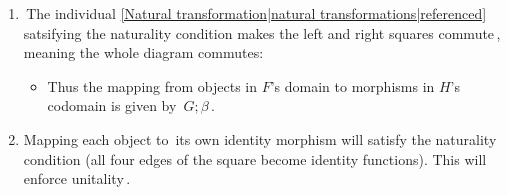 \begin{enumerate}
    \item  \,The individual \ref{Natural transformation|natural transformations|referenced} satsifying the naturality condition makes the left and right squares commute\,, meaning the whole diagram commutes: 
          \begin{itemize}
            \item Thus the mapping from objects in $F$'s domain to morphisms in $H$'s codomain is given by \,$G;\beta$\,.
          \end{itemize}
    \item Mapping each object to \,its own identity morphism will satisfy the naturality condition (all four edges of the square become identity functions). This will enforce unitality\,.
  \end{enumerate}
